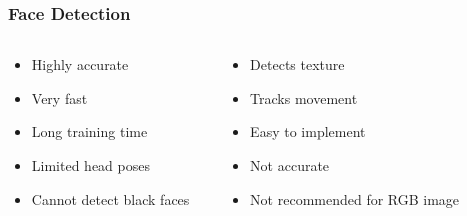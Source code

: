 \documentclass[aspectratio=149]{beamer}
\begin{document}

\begin{frame}
\frametitle{Face Detection}
\begin{columns}
	\begin{column}{.35\textwidth}
		\begin{itemize}
			\item Highly accurate
			\item Very fast
			\item Long training time
			\item Limited head poses
			\item Cannot detect black faces
		\end{itemize}
	\end{column}
	\begin{column}{.35\textwidth}
		\begin{itemize}
			\item Detects texture
			\item Tracks movement 
			\item Easy to implement
			\item Not accurate
			\item Not recommended for RGB image		
		\end{itemize}
	\end{column}
	\begin{column}{.35\textwidth}
		
	\end{column}
\end{columns} 

\end{frame}

\end{document}
